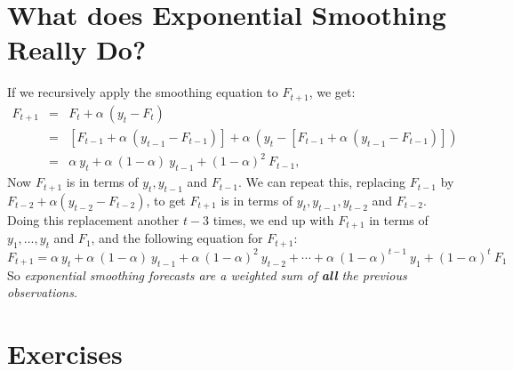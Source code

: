 \documentclass[a4paper,11pt,oneside,onecolumn]{book}
\begin{document}
\section{What does Exponential Smoothing Really Do?} 
If we
recursively apply the smoothing equation to $F_{t+1}$, we get:
\begin{eqnarray*}
F_{t+1} & = & F_t + \alpha\ (y_t - F_t) \\
& = & [F_{t-1}+\alpha\ (y_{t-1} - F_{t-1})] + \alpha\ (y_t -
[F_{t-1}+\alpha\ (y_{t-1} - F_{t-1})]) \\
& = & \alpha\ y_t + \alpha\ (1-\alpha) \ y_{t-1} + (1-\alpha)^2 \ F_{t-1},
\end{eqnarray*}
Now $F_{t+1}$ is in terms of $y_t, y_{t-1}$ and $F_{t-1}$. We can
repeat this, replacing $F_{t-1}$ by $F_{t-2} + \alpha(y_{t-2} -
F_{t-2})$, to get $F_{t+1}$ is in terms of $y_t, y_{t-1}, y_{t-2}$
and $F_{t-2}$. Doing this replacement another $t-3$ times, we end up
with $F_{t+1}$ in terms of $y_1,\ldots,y_t$ and $F_1$, and the
following equation for $F_{t+1}$:
\begin{equation}
 F_{t+1} = \alpha\ y_t + \alpha\ (1-\alpha)\ y_{t-1} + \alpha\
(1-\alpha)^2\ y_{t-2} + \cdots + \alpha\ (1-\alpha)^{t-1}\ y_1 + (1 -
\alpha)^t\  F_1
\label{eq:ses}
\end{equation}
 So {\it exponential smoothing forecasts are a
weighted sum of {\bf all} the previous observations}.





\section{Exercises}
\end{document}
